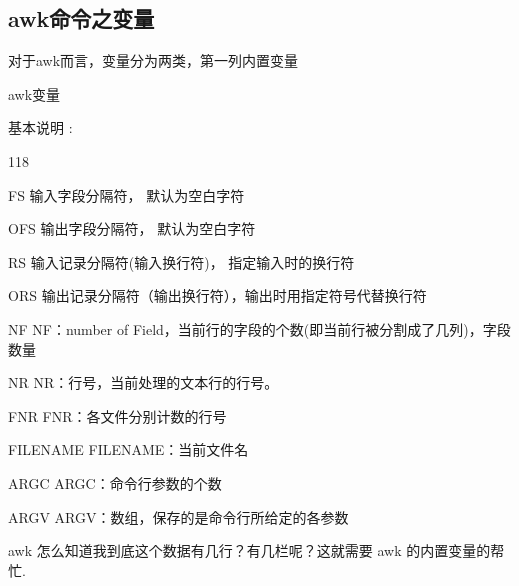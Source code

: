 \subsection{awk命令之变量}

对于awk而言，变量分为两类，第一列内置变量
\begin{ascolorbox5}{awk变量}
	\begin{ascboxE}{基本说明 :}
		\begin{dinglist}{118}
			\item FS	输入字段分隔符， 默认为空白字符
			\item OFS	输出字段分隔符， 默认为空白字符
			\item RS	输入记录分隔符(输入换行符)， 指定输入时的换行符
			\item ORS	输出记录分隔符（输出换行符），输出时用指定符号代替换行符
		\item 	NF	NF：number of Field，当前行的字段的个数(即当前行被分割成了几列)，字段数量
		\item 	NR	NR：行号，当前处理的文本行的行号。
		\item 	FNR	FNR：各文件分别计数的行号
		\item 	FILENAME	FILENAME：当前文件名
		\item 	ARGC	ARGC：命令行参数的个数
		\item 	ARGV	ARGV：数组，保存的是命令行所给定的各参数
		\end{dinglist}
	\end{ascboxE}
\end{ascolorbox5}

awk 怎么知道我到底这个数据有几行？有几栏呢？这就需要 awk 的内置变量的帮忙.

